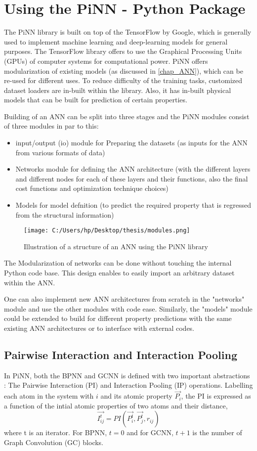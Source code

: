 \documentclass[11pt,a4paper]{report}
\begin{document}
{\section{Using the PiNN - Python Package}
The PiNN library is built on top of the TensorFlow\cite{tf} by Google, which is generally used to implement machine learning and deep-learning models for general purposes. The TensorFlow library offers to use the Graphical Processing Units (GPUs) of computer systems for computational power. PiNN offers modularization of existing models (as discussed in \ref{chap_ANN}), which can be re-used for different uses. To reduce difficulty of the training tasks, customized dataset loaders are in-built within the library.
Also, it has in-built physical models that can be built for prediction of certain properties.

Building of an ANN can be split into three stages and the PiNN modules consist of three modules in par to this:
\begin{itemize}
\item
input/output (io) module for Preparing the datasets (as inputs for the ANN from various formats of data) 
\item
Networks module for defining the ANN architecture (with the different layers and different nodes for each of these layers and their functions, also the final cost functions and optimization technique choices)
\item
Models for model defnition (to predict the required property that is regressed from the structural information)
\end{itemize}
\begin{figure}
\centering 
\texttt{[image: C:/Users/hp/Desktop/thesis/modules.png]}
\caption{Illustration of a structure of an ANN using the PiNN library}
\end{figure}

The Modularization of networks can be done without touching the internal Python code base. This design enables to easily import an arbitrary dataset within the ANN. 

One can also implement new ANN architectures from scratch in the "networks" module and use the other modules with code ease. Similarly, the "models" module could be extended to build for different property predictions with the same existing ANN architectures or to interface with external codes.

\subsection{Pairwise Interaction and Interaction Pooling} \label{PI and IP}
In PiNN, both the BPNN and GCNN is defined with two important abstractions : The Pairwise Interaction (PI) and Interaction Pooling (IP) operations. Labelling each atom in the system with $i$ and its atomic property $\vec{P_i}$, the PI is expressed as a function of the intial atomic properties of two atoms and their distance,
\begin{equation} \label{PI}
\vec{I_{ij}^t}=PI(\vec{P_i^t},\vec{P_j^t},r_{ij})
\end{equation}
where t is an iterator. For BPNN, $t=0$ and for GCNN, $t+1$ is the number of Graph Convolution (GC) blocks.

}
\end{document}
